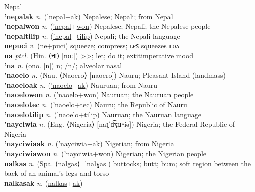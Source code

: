 Nepal \label{'nepal} \\
\textbf{'nepalak} \textit{n.} (\hyperref['nepal]{'nepal}+\hyperref[ak]{ak})
Nepalese; Nepali; from Nepal \label{'nepalak} \\
\textbf{'nepalwon} \textit{n.} (\hyperref['nepal]{'nepal}+\hyperref[won]{won})
Nepalese; Nepali; the Nepalese people \label{'nepalwon} \\
\textbf{'nepaltilip} \textit{n.} (\hyperref['nepal]{'nepal}+\hyperref[tilip]{tilip})
Nepali; the Nepali language \label{'nepaltilip} \\
\textbf{nepuci} \textit{v.} (\hyperref[ne]{ne}+\hyperref[puci]{puci})
squeeze; compress; ʟєꜱ squeezes ʟᴏᴧ \label{nepuci} \\
\textbf{na} \textit{ptcl.} (Hin. ⟨ना⟩ [nɑː])
\textgreater\textgreater; let; do it; 	extit{imperative mood} \label{na} \\
\textbf{'na} \textit{n.} (ono. [n])
n; /n/; alveolar nasal \label{'na} \\
\textbf{'naoelo} \textit{n.} (Nau. ⟨Naoero⟩ [naoero])
Nauru; Pleasant Island (landmass) \label{'naoelo} \\
\textbf{'naoeloak} \textit{n.} (\hyperref['naoelo]{'naoelo}+\hyperref[ak]{ak})
Nauruan; from Nauru \label{'naoeloak} \\
\textbf{'naoelowon} \textit{n.} (\hyperref['naoelo]{'naoelo}+\hyperref[won]{won})
Nauruan; the Nauruan people \label{'naoelowon} \\
\textbf{'naoelotec} \textit{n.} (\hyperref['naoelo]{'naoelo}+\hyperref[tec]{tec})
Nauru; the Republic of Nauru \label{'naoelotec} \\
\textbf{'naoelotilip} \textit{n.} (\hyperref['naoelo]{'naoelo}+\hyperref[tilip]{tilip})
Nauruan; the Nauruan language \label{'naoelotilip} \\
\textbf{'nayciwia} \textit{n.} (Eng. ⟨Nigeria⟩ [naɪ̯ˈd͡ʒɪɹʷiə])
Nigeria; the Federal Republic of Nigeria \label{'nayciwia} \\
\textbf{'nayciwiaak} \textit{n.} (\hyperref['nayciwia]{'nayciwia}+\hyperref[ak]{ak})
Nigerian; from Nigeria \label{'nayciwiaak} \\
\textbf{'nayciwiawon} \textit{n.} (\hyperref['nayciwia]{'nayciwia}+\hyperref[won]{won})
Nigerian; the Nigerian people \label{'nayciwiawon} \\
\textbf{nalkas} \textit{n.} (Spa. ⟨nalgas⟩ [ˈnalɣas])
buttocks; butt; bum; soft region between the back of an animal's legs and torso \label{nalkas} \\
\textbf{nalkasak} \textit{n.} (\hyperref[nalkas]{nalkas}+\hyperref[ak]{ak})
